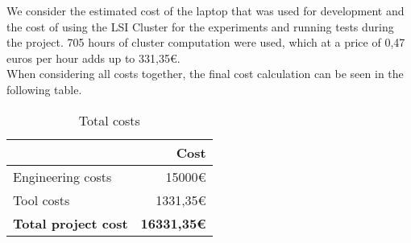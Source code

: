 We consider the estimated cost of the laptop that was used for development and the cost of using the LSI Cluster for the experiments and running tests during the project. 705 hours of cluster computation were used, which at a price of 0,47 euros per hour adds up to 331,35\euro. \\

When considering all costs together, the final cost calculation can be seen in the following table. \\

\begin{table}[htbp]
\centering
\begin{tabular}{lr}
& \textbf{Cost} \\
\hline
Engineering costs & 15000\euro \\
Tool costs & 1331,35\euro \\
\hline
\textbf{Total project cost} & \textbf{16331,35\euro}
\end{tabular}
\caption{Total costs}
\end{table}



